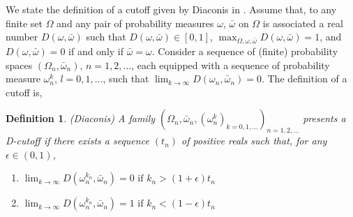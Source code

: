 \documentclass[landscape,a0b,final]{a0poster}
\newtheorem{definition}{Definition}
\newenvironment{poster}{
  \begin{center}
  \begin{minipage}[c]{0.98\textwidth}
}{
  \end{minipage} 
  \end{center}
}
\newenvironment{pcolumn}[1]{
  \begin{minipage}{#1\textwidth}
  \begin{center}
}{
  \end{center}
  \end{minipage}
}
\newcommand{\pbox}[4]{
\psshadowbox[#3]{
\begin{minipage}[t][#2][t]{#1}
#4
\end{minipage}
}}
\begin{document}
\begin{poster}
\begin{center}
\begin{pcolumn}{0.32}
{%




\vspace{0.7cm}\begin{center}\pbox{0.8\textwidth}{}{linewidth=2mm,framearc=0.1,linecolor=red,fillstyle=gradient,gradangle=0,gradbegin=white,gradend=whitered,gradmidpoint=1.0,framesep=1em}{\begin{center}\bfseries{\large{Cutoff Phenomenon}}\end{center}}\end{center}\vspace{1cm}
We state the definition of a cutoff given by Diaconis in
\cite{Diaconis2005}. Assume that, to any finite set $\Omega$ and any
pair of probability measures $\omega$, $\bar{\omega}$ on $\Omega$ is associated
a real number $D(\omega,\bar{\omega})$ such that $D(\omega,\bar{\omega})\in [0,1]$,
$\max_{\Omega,\omega,\bar{\omega}} D(\omega,\bar{\omega}) = 1$, 
and $D(\omega,\bar{\omega})=0$ if and only if $\bar{\omega}=\omega$. Consider a sequence of
(finite) probability spaces $(\Omega_n,\bar{\omega}_n)$, $n=1,2,...$, each
equipped with a sequence of probability measure $\omega^k_n$,
$l=0,1,...$, such that
$\lim_{k \rightarrow \infty} D(\omega_n,\bar{\omega}_n)=0$.
The definition of a cutoff is,

\begin{definition}
\label{cutoffdefinition}
(Diaconis) A family $(\Omega_n,\bar{\omega}_n, (\omega^k_n)_{k=0,1,...})_{n=1,2,...}$
presents a D-cutoff if there exists a sequence $(t_n)$ of positive
reals such that, for any $\epsilon \in(0,1)$,
\begin{enumerate}
  \item $\lim_{k \rightarrow \infty}D(\omega^{k_n}_n,\bar{\omega}_n) = 0 \mbox{ if }
  k_n>(1+\epsilon)t_n$
  \item $\lim_{k \rightarrow \infty}D(\omega^{k_n}_n,\bar{\omega}_n) = 1 \mbox{ if }
  k_n<(1-\epsilon)t_n $
\end{enumerate}
\end{definition}

}
\end{pcolumn}
\end{center}
\end{poster}
\end{document}
